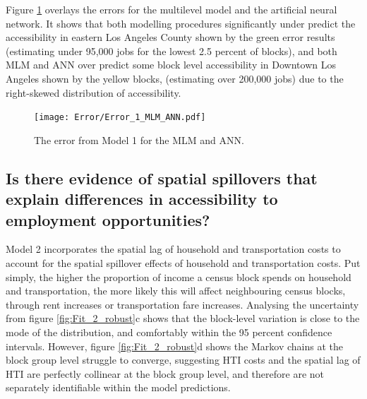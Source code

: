 \documentclass[a4paper,UKenglish]{lipics-v2018}
\begin{document}
Figure \ref{fig:Error_1_MLM_ANN} overlays the errors for the multilevel model and the artificial neural network. It shows that both modelling procedures significantly under predict the accessibility in eastern Los Angeles County  shown by the green error results (estimating under 95,000 jobs for the lowest 2.5 percent of blocks), and both MLM and ANN over predict some block level accessibility in Downtown Los Angeles shown by the yellow blocks, (estimating over 200,000 jobs) due to the right-skewed distribution of accessibility.  

\begin{figure}[H]
    \centering
    \texttt{[image: Error/Error\_1\_MLM\_ANN.pdf]}
    \caption[Model 1 error]{The error from Model 1 for the MLM and ANN.} 
    \label{fig:Error_1_MLM_ANN}
\end{figure}

\subsection{Is there evidence of spatial spillovers that explain differences in accessibility to employment opportunities?} 
Model 2 incorporates the spatial lag of household and transportation costs to account for the spatial spillover effects of household and transportation costs. Put simply, the higher the proportion of income a census block spends on household and transportation, the more likely this will affect neighbouring census blocks, through rent increases or transportation fare increases. Analysing the uncertainty from figure \ref{fig:Fit_2_robust}c shows that the block-level variation is close to the mode of the distribution, and comfortably within the 95 percent confidence intervals. However, figure \ref{fig:Fit_2_robust}d shows the Markov chains at the block group level struggle to converge, suggesting HTI costs and the spatial lag of HTI are perfectly collinear at the block group level, and therefore are not separately identifiable within the model predictions.
\end{document}
